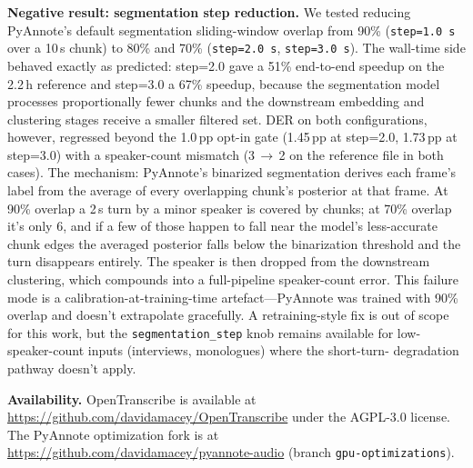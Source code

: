 \documentclass[conference,10pt]{IEEEtran}
\begin{document}
\vspace{0.5em}
\noindent\textbf{Negative result: segmentation step reduction.}\quad
We tested reducing PyAnnote's default segmentation sliding-window overlap
from 90\% (\texttt{step=1.0\,s} over a 10\,s chunk) to 80\% and 70\%
(\texttt{step=2.0\,s}, \texttt{step=3.0\,s}). The wall-time
side behaved exactly as predicted: step=2.0 gave a 51\% end-to-end speedup
on the 2.2\,h reference and step=3.0 a 67\% speedup, because the segmentation
model processes proportionally fewer chunks and the downstream embedding and
clustering stages receive a smaller filtered set. DER on both configurations,
however, regressed beyond the 1.0\,pp opt-in gate (1.45\,pp at step=2.0,
1.73\,pp at step=3.0) with a speaker-count mismatch (3\,$\to$\,2 on the
reference file in both cases). The mechanism: PyAnnote's binarized segmentation
derives each frame's label from the average of every overlapping chunk's
posterior at that frame. At 90\% overlap a 2\,s turn by a minor speaker is
covered by  chunks; at 70\% overlap it's only 6, and if a few of
those happen to fall near the model's less-accurate chunk edges the averaged
posterior falls below the binarization threshold and the turn disappears
entirely. The speaker is then dropped from the downstream clustering, which
compounds into a full-pipeline speaker-count error. This failure mode is a
calibration-at-training-time artefact---PyAnnote was trained with 90\% overlap
and doesn't extrapolate gracefully. A retraining-style fix is out of scope
for this work, but the \texttt{segmentation\_step} knob remains available
for low-speaker-count inputs (interviews, monologues) where the short-turn-
degradation pathway doesn't apply.

\vspace{0.5em}
\noindent\textbf{Availability.}\quad
OpenTranscribe is available at
\url{https://github.com/davidamacey/OpenTranscribe} under the AGPL-3.0 license.
The PyAnnote optimization fork is at
\url{https://github.com/davidamacey/pyannote-audio} (branch
\texttt{gpu-optimizations}).



\end{document}
